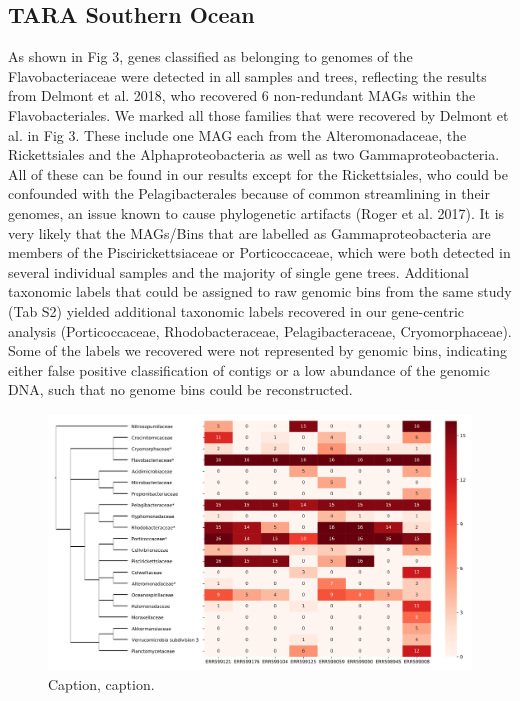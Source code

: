 \documentclass{bioinfo}
\begin{document}
\subsection{TARA Southern Ocean}
As shown in Fig 3, genes classified as belonging to genomes of the Flavobacteriaceae were detected in all samples and trees, reflecting the results from Delmont et al. 2018, who recovered 6 non-redundant MAGs within the Flavobacteriales. We marked all those families that were recovered by Delmont et al. in Fig 3. These include one MAG each from the Alteromonadaceae, the Rickettsiales and the Alphaproteobacteria as well as two Gammaproteobacteria. All of these can be found in our results except for the Rickettsiales, who could be confounded with the Pelagibacterales because of common streamlining in their genomes, an issue known to cause phylogenetic artifacts (Roger et al. 2017). It is very likely that the MAGs/Bins that are labelled as Gammaproteobacteria are members of the Piscirickettsiaceae or Porticoccaceae, which were both detected in several individual samples and the majority of single gene trees. Additional taxonomic labels that could be assigned to raw genomic bins from the same study (Tab S2) yielded additional taxonomic labels recovered in our gene-centric analysis (Porticoccaceae, Rhodobacteraceae, Pelagibacteraceae, Cryomorphaceae). Some of the labels we recovered were not represented by genomic bins, indicating either false positive classification of contigs or a low abundance of the genomic DNA, such that no genome bins could be reconstructed.

\begin{figure}[!tpb]%
\centerline{\includegraphics[width=\textwidth]{figures/Fig3.png}}
\caption{Caption, caption.}\label{fig:03}
\end{figure}
\end{document}
